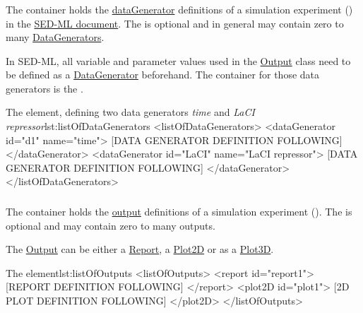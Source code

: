 \subsubsection{}
\label{sec:listOfDataGenerators}
The  container holds the \hyperref[class:dataGenerator]{dataGenerator} definitions of a simulation experiment () in the \hyperref[class:sed-ml]{SED-ML document}. The  is optional and in general may contain zero to many \hyperref[class:dataGenerator]{DataGenerators}.

In SED-ML, all variable and parameter values used in the \hyperref[class:output]{Output} class need to be defined as a \hyperref[class:dataGenerator]{DataGenerator} beforehand. The container for those data generators is the .



\begin{myXmlLst}{The  element, defining two data generators \emph{time} and \emph{LaCI repressor}}{lst:listOfDataGenerators}
<listOfDataGenerators>
	<dataGenerator id="d1" name="time">
		[DATA GENERATOR DEFINITION FOLLOWING]
	</dataGenerator>
	<dataGenerator id="LaCI" name="LaCI repressor">
		[DATA GENERATOR DEFINITION FOLLOWING]
	</dataGenerator>
</listOfDataGenerators>
\end{myXmlLst}


\subsubsection{}
\label{sec:listOfOutputs}
The  container holds the \hyperref[class:output]{output} definitions of a simulation experiment (). The  is optional and may contain zero to many outputs.

The \hyperref[class:output]{Output} can be either a \hyperref[class:report]{Report}, a \hyperref[class:plot2D]{Plot2D} or as a \hyperref[class:plot3D]{Plot3D}. 

\begin{myXmlLst}{The  element}{lst:listOfOutputs}
<listOfOutputs>
	<report id="report1">
		[REPORT DEFINITION FOLLOWING]
	</report>
	<plot2D id="plot1">
		[2D PLOT DEFINITION FOLLOWING] 
	</plot2D>
</listOfOutputs>
\end{myXmlLst}